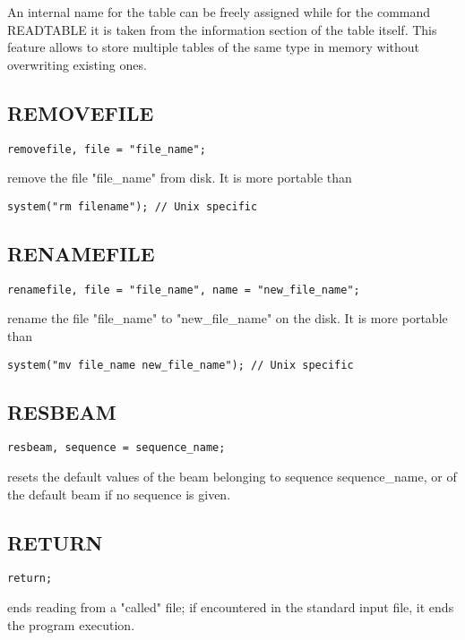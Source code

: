 An internal name for
the table can be freely assigned while for the command READTABLE it is
taken from the information section of the table itself. This feature
allows to store multiple tables of the same type in memory without
overwriting existing ones.   


\subsection{REMOVEFILE}
\begin{verbatim}
removefile, file = "file_name";
\end{verbatim} 
remove the file "file\_name" from disk. It is more portable than  
\begin{verbatim}
system("rm filename"); // Unix specific
\end{verbatim}

\subsection{RENAMEFILE}
\begin{verbatim}
renamefile, file = "file_name", name = "new_file_name";
\end{verbatim} 
rename the file "file\_name" to "new\_file\_name" on the disk. It is more
portable than  
\begin{verbatim}
system("mv file_name new_file_name"); // Unix specific
\end{verbatim}


\subsection{RESBEAM}
\begin{verbatim}
resbeam, sequence = sequence_name;
\end{verbatim} 
resets the default values of the beam belonging to sequence sequence\_name, or
of the default beam if no sequence is given.  


\subsection{RETURN}
\begin{verbatim}
return;
\end{verbatim} 
ends reading from a "called" file; if encountered in the standard input
file, it ends the program execution.  


